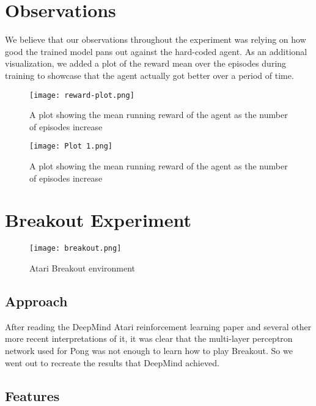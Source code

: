 \documentclass[%
 aip,
 jmp,%
 amsmath,amssymb,
 reprint,%
]{revtex4-1}
\begin{document}
\FloatBarrier

\section{Observations}

We believe that our observations throughout the experiment was relying on how good the trained model pans out against the hard-coded agent. As an additional visualization, we added a plot of the reward mean over the episodes during training to showcase that the agent actually got better over a period of time. 

\begin{figure}[h]
\texttt{[image: reward-plot.png]}
\caption{A plot showing the mean running reward of the agent as the number of episodes increase}
\label{fig:rewards}
\end{figure}

\begin{figure}[h]
\texttt{[image: Plot 1.png]}
\caption{A plot showing the mean running reward of the agent as the number of episodes increase}
\label{fig:plot1}
\end{figure}

\FloatBarrier


\section{Breakout Experiment}
\begin{figure}[th]
\texttt{[image: breakout.png]}
\caption{Atari Breakout environment}
\label{fig:breakout}
\end{figure}


\subsection{Approach}
After reading the DeepMind Atari reinforcement learning paper and several other more recent interpretations of it, it was clear that the multi-layer perceptron network used for Pong was not enough to learn how to play Breakout. So we went out to recreate the results that DeepMind achieved.

\subsection{Features}
\end{document}
